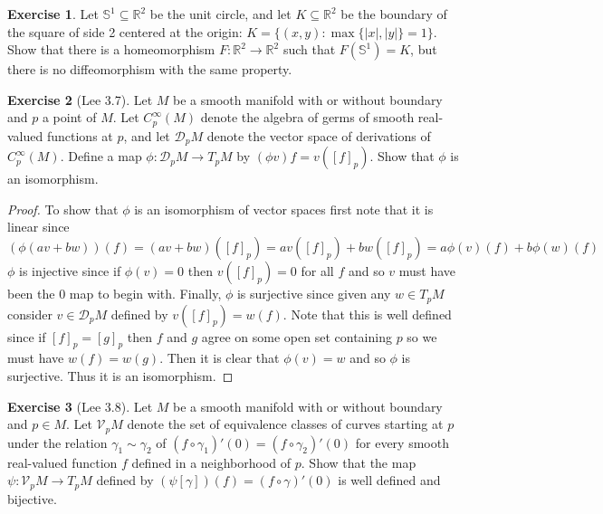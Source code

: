 \documentclass{article}
\newcommand{\bR}{\mathbb{R}}
\newcommand{\bS}{\mathbb{S}}
\newcommand{\cD}{\mathcal{D}}
\newcommand{\cV}{\mathcal{V}}
\theoremstyle{definition}
\newtheorem{exercise}{Exercise}
\begin{document}
\begin{exercise}
    Let $\bS^1 \subseteq \bR^2$ be the unit circle, and let $K \subseteq \bR^2$ be the boundary of the square of side 2 centered at the origin: $K = \{(x,y) \colon \max\{|x|, |y|\} = 1\}$. Show that there is a homeomorphism $F: \bR^2 \to \bR^2$ such that $F(\bS^1) = K$, but there is no diffeomorphism with the same property.  
\end{exercise}

\begin{exercise}[Lee 3.7]
    Let $M$ be a smooth manifold with or without boundary and $p$ a point of $M$. Let $C_p^{\infty}(M)$ denote the algebra of germs of smooth real-valued functions at $p$, and let $\cD_pM$ denote the vector space of derivations of $C_p^{\infty}(M)$. Define a map $\phi: \cD_pM \to T_pM$ by $(\phi v)f = v([f]_p)$. Show that $\phi$ is an isomorphism.
\end{exercise}

\begin{proof}
    To show that $\phi$ is an isomorphism of vector spaces first note that it is linear since 
    \[(\phi(av+bw))(f) = (av+bw)([f]_p) = av([f]_p) + bw([f]_p) = a \phi(v)(f) + b\phi(w)(f) \] 
    $\phi$ is injective since if $\phi(v)=0$ then $v([f]_p)=0$ for all $f$ and so $v$ must have been the 0 map to begin with. Finally, $\phi$ is surjective since given any $w \in T_pM$ consider $v \in \cD_pM$ defined by $v([f]_p)=w(f)$. Note that this is well defined since if $[f]_p = [g]_p$ then $f$ and $g$ agree on some open set containing $p$ so we must have $w(f) = w(g)$. Then it is clear that $\phi(v)=w$ and so $\phi$ is surjective. Thus it is an isomorphism. 
\end{proof}

\begin{exercise}[Lee 3.8]
    Let $M$ be a smooth manifold with or without boundary and $p \in M$. Let $\cV_p M$ denote the set of equivalence classes of curves starting at $p$ under the relation $\gamma_1 \sim \gamma_2$ of $(f \circ \gamma_1)'(0) = (f \circ \gamma_2)'(0)$ for every smooth real-valued function $f$ defined in a neighborhood of $p$. Show that the map $\psi: \cV_pM \to T_pM$ defined by $(\psi[\gamma])(f) = (f \circ \gamma)'(0)$ is well defined and bijective.  
\end{exercise}
\end{document}
